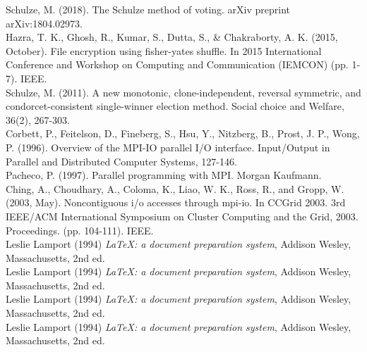 \documentclass[final,5p,times,twocolumn,authoryear, 10pt]{elsarticle}
\begin{document}
%  
% 


\begin{thebibliography}{20}

Schulze, M. (2018). The Schulze method of voting. arXiv preprint
arXiv:1804.02973. 
\\
Hazra, T. K., Ghosh, R., Kumar, S., Dutta, S., \& Chakraborty, A. K. (2015,
October). File encryption using fisher-yates shuffle. In 2015 International
Conference and Workshop on Computing and Communication (IEMCON) (pp. 1-7).
IEEE.
\\ 
Schulze, M. (2011). A new monotonic, clone-independent, reversal symmetric, and
condorcet-consistent single-winner election method. Social choice and Welfare,
36(2), 267-303.
\\
Corbett, P., Feitelson, D., Fineberg, S., Hsu, Y., Nitzberg, B., Prost, J. P.,
Wong, P. (1996). Overview of the MPI-IO parallel I/O interface. Input/Output in
Parallel and Distributed Computer Systems, 127-146.
\\
Pacheco, P. (1997). Parallel programming with MPI. Morgan Kaufmann.
\\
Ching, A., Choudhary, A., Coloma, K., Liao, W. K., Ross, R., and Gropp, W.
(2003, May). Noncontiguous i/o accesses through mpi-io. In CCGrid 2003. 3rd
IEEE/ACM International Symposium on Cluster Computing and the Grid, 2003.
Proceedings. (pp. 104-111). IEEE. \\

Leslie Lamport (1994) \emph{\LaTeX: a document preparation system}, Addison
Wesley, Massachusetts, 2nd ed.
\\
Leslie Lamport (1994) \emph{\LaTeX: a document preparation system}, Addison
Wesley, Massachusetts, 2nd ed.
\\
Leslie Lamport (1994) \emph{\LaTeX: a document preparation system}, Addison
Wesley, Massachusetts, 2nd ed.
\\
Leslie Lamport (1994) \emph{\LaTeX: a document preparation system}, Addison
Wesley, Massachusetts, 2nd ed.

\end{thebibliography}
\end{document}
